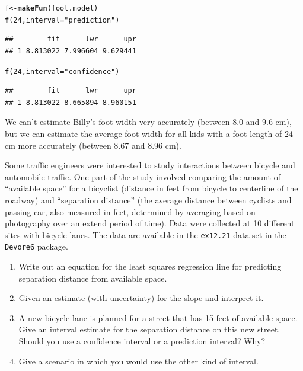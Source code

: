\documentclass[twoside]{book}
\makeatletter
\newcommand{\hlnum}[1]{\textcolor[rgb]{0.686,0.059,0.569}{#1}}%
\newcommand{\hlstr}[1]{\textcolor[rgb]{0.192,0.494,0.8}{#1}}%
\newcommand{\hlstd}[1]{\textcolor[rgb]{0.345,0.345,0.345}{#1}}%
\newcommand{\hlkwb}[1]{\textcolor[rgb]{0.69,0.353,0.396}{#1}}%
\newcommand{\hlkwc}[1]{\textcolor[rgb]{0.333,0.667,0.333}{#1}}%
\newcommand{\hlkwd}[1]{\textcolor[rgb]{0.737,0.353,0.396}{\textbf{#1}}}%
\newenvironment{kframe}{%
 \def\at@end@of@kframe{}%
 \ifinner\ifhmode%
  \def\at@end@of@kframe{\end{minipage}}%
  \begin{minipage}{\columnwidth}%
 \fi\fi%
 \def\FrameCommand##1{\hskip\@totalleftmargin \hskip-\fboxsep
 \colorbox{shadecolor}{##1}\hskip-\fboxsep
     \hskip-\linewidth \hskip-\@totalleftmargin \hskip\columnwidth}%
 \MakeFramed {\advance\hsize-\width
   \@totalleftmargin\z@ \linewidth\hsize
   \@setminipage}}%
 {\par\unskip\endMakeFramed%
 \at@end@of@kframe}
\newenvironment{knitrout}{}{} %
\newcommand{\Rindex}[1]{\index{\texttt{#1}}}
\newcommand{\dataframe}[1]{{\color{blue!80!black}\texttt{#1}}\Rindex{#1}}
\newcommand{\pkg}[1]{{\color{red!80!black}\texttt{#1}}\Rindex{#1}}
\makeatother
\begin{document}
\begin{solution}
\begin{knitrout}
\color{fgcolor}\begin{kframe}
\begin{alltt}
\hlstd{f} \hlkwb{<-} \hlkwd{makeFun}\hlstd{(foot.model)}
\hlkwd{f}\hlstd{(}\hlnum{24}\hlstd{,} \hlkwc{interval} \hlstd{=} \hlstr{"prediction"}\hlstd{)}
\end{alltt}
\begin{verbatim}
##        fit      lwr      upr
## 1 8.813022 7.996604 9.629441
\end{verbatim}
\begin{alltt}
\hlkwd{f}\hlstd{(}\hlnum{24}\hlstd{,} \hlkwc{interval} \hlstd{=} \hlstr{"confidence"}\hlstd{)}
\end{alltt}
\begin{verbatim}
##        fit      lwr      upr
## 1 8.813022 8.665894 8.960151
\end{verbatim}
\end{kframe}
\end{knitrout}
We can't estimate Billy's foot width very accurately (between 8.0 and 9.6 cm),
but we can estimate the average foot width for all kids with a foot length of
24 cm more accurately (between 8.67 and 8.96 cm).
\end{solution}

\begin{problem}
	Some traffic engineers were interested to study interactions between bicycle and 
	automobile traffic.  One part of the study involved comparing the amount of 
	``available space'' for a bicyclist 
	(distance in feet from bicycle to centerline of the roadway) and 
	``separation distance'' 
	(the average distance between cyclists and passing car, also measured in feet, 
	determined by averaging based on photography over an extend period of time).
	Data were collected at 10 different sites with bicycle lanes.
	The data are available in the \dataframe{ex12.21} data set in 
	the \pkg{Devore6} package.

	\begin{enumerate}
		\item Write out an equation for the least squares regression line for 
			predicting separation distance from available space.
		\item Given an estimate (with uncertainty) for the slope and interpret it.
		\item A new bicycle lane is planned for a street that has 15 feet of available
			space.  Give an interval estimate for the separation distance 
			on this new street.  Should you use a confidence interval or a prediction
			interval?  Why?
		\item
			Give a scenario in which you would use the other kind of interval.
	\end{enumerate}
\end{problem}
\end{document}

